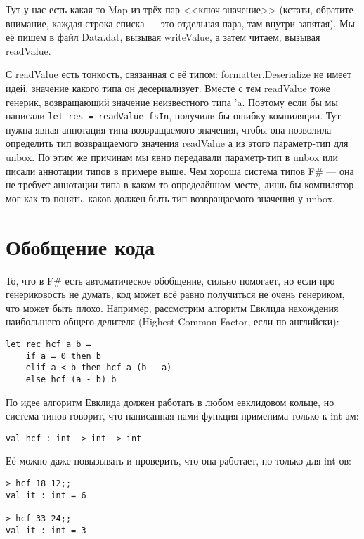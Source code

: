 \documentclass[a5paper]{article}
\begin{document}
Тут у нас есть какая-то Map из трёх пар <<ключ-значение>> (кстати, обратите внимание, каждая строка списка --- это отдельная пара, там внутри запятая). Мы её пишем в файл Data.dat, вызывая writeValue, а затем читаем, вызывая readValue. 

С readValue есть тонкость, связанная с её типом: formatter.Deserialize не имеет идей, значение какого типа он десериализует. Вместе с тем readValue тоже генерик, возвращающий значение неизвестного типа 'a. Поэтому если бы мы написали \texttt{let res = readValue fsIn}, получили бы ошибку компиляции. Тут нужна явная аннотация типа возвращаемого значения, чтобы она позволила определить тип возвращаемого значения readValue а из этого параметр-тип для unbox. По этим же причинам мы явно передавали параметр-тип в unbox или писали аннотации типов в примере выше. Чем хороша система типов F\# --- она не требует аннотации типа в каком-то определённом месте, лишь бы компилятор мог как-то понять, каков должен быть тип возвращаемого значения у unbox.

\section{Обобщение кода}

То, что в F\# есть автоматическое обобщение, сильно помогает, но если про генериковость не думать, код может всё равно получиться не очень генериком, что может быть плохо. Например, рассмотрим алгоритм Евклида нахождения наибольшего общего делителя (Highest Common Factor, если по-английски):

\begin{verbatim}
let rec hcf a b =
    if a = 0 then b
    elif a < b then hcf a (b - a)
    else hcf (a - b) b
\end{verbatim}

По идее алгоритм Евклида должен работать в любом евклидовом кольце, но система типов говорит, что написанная нами функция применима только к int-ам:

\begin{verbatim}
val hcf : int -> int -> int
\end{verbatim}

Её можно даже повызывать и проверить, что она работает, но только для int-ов:

\begin{verbatim}
> hcf 18 12;;
val it : int = 6

> hcf 33 24;;
val it : int = 3
\end{verbatim}
\end{document}
